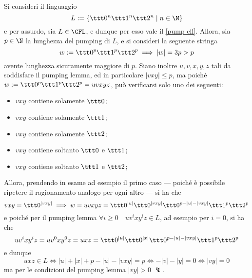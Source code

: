 \documentclass[a4paper, 12pt]{report}
\begin{document}
    \begin{example}
        \label{pump cfl ex1}
        Si consideri il linguaggio $$L := \{\ttt 0 ^n \ttt 1 ^n \ttt 2 ^n \mid n \in \N\}$$ e per assurdo, sia $L \in \mathrm{\CFL}$, e dunque per esso vale il \cref{pump cfl}. Allora, sia $p \in \N$ la lunghezza del pumping di $L$, e si consideri la seguente stringa $$w:=\ttt 0^p \ttt 1^p \ttt 2 ^p \implies |w| = 3p > p$$ avente lunghezza sicuramente maggiore di $p$. Siano inoltre $u, v, x, y, z$ tali da soddisfare il pumping lemma, ed in particolare $|vxy| \le p$, ma poiché $w := \ttt 0^p \ttt 1 ^p \ttt 2^p = uvxyz$, può verificarsi solo uno dei seguenti:

        \begin{itemize}
            \item $vxy$ contiene solamente $\ttt 0$;
            \item $vxy$ contiene solamente $\ttt 1$;
            \item $vxy$ contiene solamente $\ttt 2$;
            \item $vxy$ contiene soltanto $\ttt 0$ e $\ttt 1$;
            \item $vxy$ contiene soltanto $\ttt 1$ e $\ttt 2$;
        \end{itemize}
        
        Allora, prendendo in esame ad esempio il primo caso --- poiché è possibile ripetere il ragionamento analogo per ogni altro --- si ha che $$vxy =  \ttt 0 ^{|vxy|} \implies w = uvxyz = \ttt 0^{|u|}\ttt 0 ^{|vxy|} \ttt 0^{p - |u| - |vxy|} \ttt 1 ^p \ttt 2 ^p$$ e poiché per il pumping lemma $\forall i \ge 0 \quad uv^ixy^iz \in L$, ad esempio per $i = 0$, si ha che $$uv^i xy^iz = u v^0 xy^0 z = uxz = \ttt 0 ^{|u|} \ttt 0 ^ {|x|} \ttt 0 ^{p - |u|- |vxy|} \ttt 1^p \ttt 2^p$$ e dunque $$uxz \in L \iff |u| + |x| + p - |u| - |vxy| = p \iff - |v| - |y| = 0 \iff |vy| = 0$$ ma per le condizioni del pumping lemma $|vy| > 0$ $\lightning$.
    \end{example}
\end{document}
